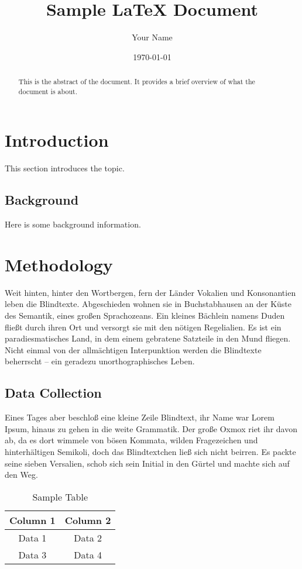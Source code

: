 \documentclass[12pt,a4paper]{article}
\title{Sample LaTeX Document}
\author{Your Name}
\date{\today}
\begin{document}
\maketitle

\begin{abstract}
This is the abstract of the document. It provides a brief overview of what the document is about.
\end{abstract}

\section{Introduction}
This section introduces the topic.

\subsection{Background}
Here is some background information.

\section{Methodology}
\label{sec:methodology}

Weit hinten, hinter den Wortbergen, fern der Länder Vokalien und Konsonantien leben die Blindtexte. Abgeschieden wohnen sie in Buchstabhausen an der Küste des Semantik, eines großen Sprachozeans. Ein kleines Bächlein namens Duden fließt durch ihren Ort und versorgt sie mit den nötigen Regelialien. Es ist ein paradiesmatisches Land, in dem einem gebratene Satzteile in den Mund fliegen. Nicht einmal von der allmächtigen Interpunktion werden die Blindtexte beherrscht – ein geradezu unorthographisches Leben.

\subsection{Data Collection}

 Eines Tages aber beschloß eine kleine Zeile Blindtext, ihr Name war Lorem Ipsum, hinaus zu gehen in die weite Grammatik. Der große Oxmox riet ihr davon ab, da es dort wimmele von bösen Kommata, wilden Fragezeichen und hinterhältigen Semikoli, doch das Blindtextchen ließ sich nicht beirren. Es packte seine sieben Versalien, schob sich sein Initial in den Gürtel und machte sich auf den Weg.

\begin{table}[h]

\centering

\begin{tabular}{|c|c|}
\hline
Column 1 & Column 2 \\
\hline
Data 1 & Data 2 \\
Data 3 & Data 4 \\
\hline
\end{tabular}

\caption{Sample Table}
\label{tab:sample}

\end{table}
\end{document}
